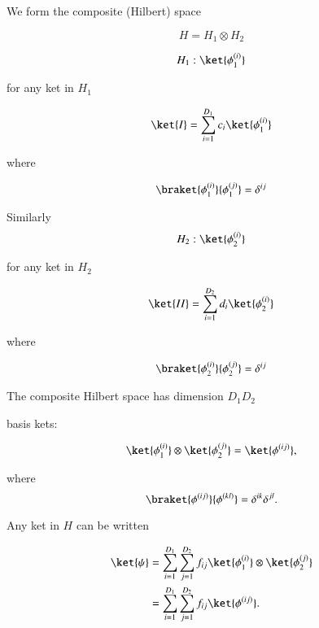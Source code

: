 We form the composite (Hilbert) space

\begin{equation}\label{eqn:qmTwoL1:50}
H = H_1 \otimes H_2
\end{equation}

\begin{equation}\label{eqn:qmTwoL1:70}
H_1 : { \ket{\phi_1^{(i)}} }
\end{equation}

for any ket in $H_1$

\begin{equation}\label{eqn:qmTwoL1:90}
\ket{I} = \sum_{i=1}^{D_1} c_i \ket{\phi_1^{(i)}} 
\end{equation}

where

\begin{equation}\label{eqn:qmTwoL1:110}
\braket{ \phi_1^{(i)}}{ \phi_1^{(j)}} = \delta^{i j}
\end{equation}

Similarly
\begin{equation}\label{eqn:qmTwoL1:130}
H_2 : { \ket{\phi_2^{(i)}} }
\end{equation}

for any ket in $H_2$

\begin{equation}\label{eqn:qmTwoL1:150}
\ket{II} = \sum_{i=1}^{D_2} d_i \ket{\phi_2^{(i)}} 
\end{equation}

where

\begin{equation}\label{eqn:qmTwoL1:170}
\braket{ \phi_2^{(i)}}{ \phi_2^{(j)}} = \delta^{i j}
\end{equation}

The composite Hilbert space has dimension $D_1 D_2$

basis kets:

\begin{equation}\label{eqn:qmTwoL1:190}
\ket{ \phi_1^{(i)}} \otimes \ket{ \phi_2^{(j)}}  = \ket{ \phi^{(ij)}},
\end{equation}

where
\begin{equation}\label{eqn:qmTwoL1:210}
\braket{ \phi^{(ij)}}{ \phi^{(kl)}} = \delta^{ik} \delta^{jl}.
\end{equation}

Any ket in $H$ can be written

\begin{align*}
\ket{\psi} 
&= 
\sum_{i = 1}^{D_1}
\sum_{j = 1}^{D_2}
f_{ij}
\ket{ \phi_1^{(i)}} \otimes \ket{ \phi_2^{(j)}}  \\
&= 
\sum_{i = 1}^{D_1}
\sum_{j = 1}^{D_2}
f_{ij}
\ket{ \phi^{(ij)}}.
\end{align*}

